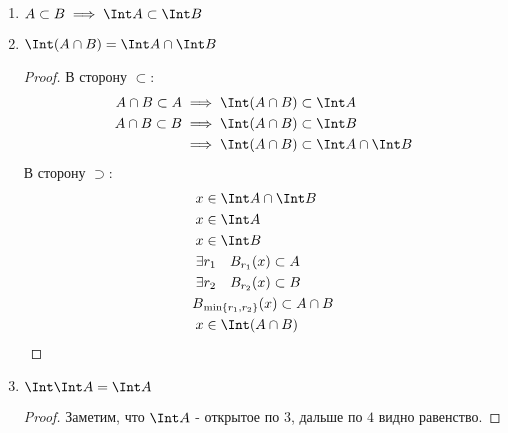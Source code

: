 \begin{properties}
\begin{enumerate}
\begin{proof}
                Необходимость ($\implies$): $\Int A$ открыто.

                Достаточность ($\impliedby$): $A$ открыто $\implies$ все точки внутренние $\implies$ $A = \Int A$.
            \end{proof}
        \item $A \subset B \implies \Int A \subset \Int B$
        \item $\Int (A\cap B) = \Int A\cap \Int B$
            \begin{proof} \thmslashn

                В сторону $ \subset $:
                \begin{equation*}
                    \begin{split}
                        A\cap B \subset A 
                        &\implies \Int (A\cap B) \subset \Int A\\
                        A\cap B \subset B 
                        &\implies \Int (A\cap B) \subset \Int B\\
                        &\implies \Int (A\cap B) \subset \Int A\cap \Int B
                    \end{split}
                \end{equation*}
                В сторону $\supset$:
                \begin{equation*}
                    \begin{split}
                        x&\in \Int A\cap \Int B\\
                        x&\in \Int A\\
                        x&\in \Int B\\
                        \exists&{r_1}\quad B_{r_1}(x) \subset A\\
                        \exists&{r_2}\quad B_{r_2}(x) \subset B\\
                        B&_{\min \{r_1, r_2\} }(x) \subset A\cap B\\
                        x&\in \Int (A\cap B)
                    \end{split}
                \end{equation*}
            \end{proof}
        \item $\Int \Int A = \Int A$
             \begin{proof} \thmslashn
            
                Заметим, что $\Int A$ - открытое по $3$, дальше по $4$ видно равенство.
            \end{proof}
    \end{enumerate}
\end{properties}
